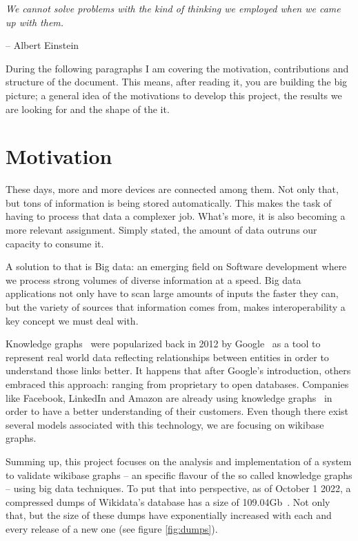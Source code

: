 \epigraph{\textit{We cannot solve problems with the kind of thinking we employed when we came up with them.}}{-- \textup{Albert Einstein}}

During the following paragraphs I am covering the motivation, contributions and structure of the document. This means, after reading it, you are building the big picture; a general idea of the motivations to develop this project, the results we are looking for and the shape of the it.

\section{Motivation}

These days, more and more devices are connected among them. Not only that, but tons of information is being stored automatically. This makes the task of having to process that data a complexer job. What's more, it is also becoming a more relevant assignment. Simply stated, the amount of data outruns our capacity to consume it.

A solution to that is Big data: an emerging field on Software development where we process strong volumes of diverse information at a speed. Big data applications not only have to scan large amounts of inputs the faster they can, but the variety of sources that information comes from, makes interoperability a key concept we must deal with.

Knowledge graphs~\cite{https://doi.org/10.48550/arxiv.2110.11709} were popularized back in 2012 by Google~\cite{web:knowledge_graphs:google} as a tool to represent real world data reflecting relationships between entities in order to understand those links better. It happens that after Google's introduction, others embraced this approach: ranging from proprietary to open databases. Companies like Facebook, LinkedIn and Amazon are already using knowledge graphs~\cite{web:knowledge_graphs:use} in order to have a better understanding of their customers. Even though there exist several models associated with this technology, we are focusing on wikibase graphs.

Summing up, this project focuses on the analysis and implementation of a system to validate wikibase graphs -- an specific flavour of the so called knowledge graphs -- using big data techniques. To put that into perspective, as of October 1 2022, a compressed \gls{dumps} of Wikidata's database has a size of 109.04Gb~\cite{wikidata:dumps}. Not only that, but the size of these dumps have exponentially increased with each and every release of a new one (see figure \ref{fig:dumps}).

